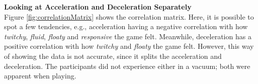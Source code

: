 \textbf{Looking at Acceleration and Deceleration Separately}\\
Figure \ref{fig:correlationMatrix} shows the correlation matrix. Here, it is possible to spot a few tendencies, e.g., acceleration having a negative correlation with how \textit{twitchy}, \textit{fluid}, \textit{floaty} and \textit{responsive} the game felt. Meanwhile, deceleration has a positive correlation with how \textit{twitchy} and \textit{floaty} the game felt. However, this way of showing the data is not accurate, since it splits the acceleration and deceleration. The participants did not experience either in a vacuum; both were apparent when playing.







